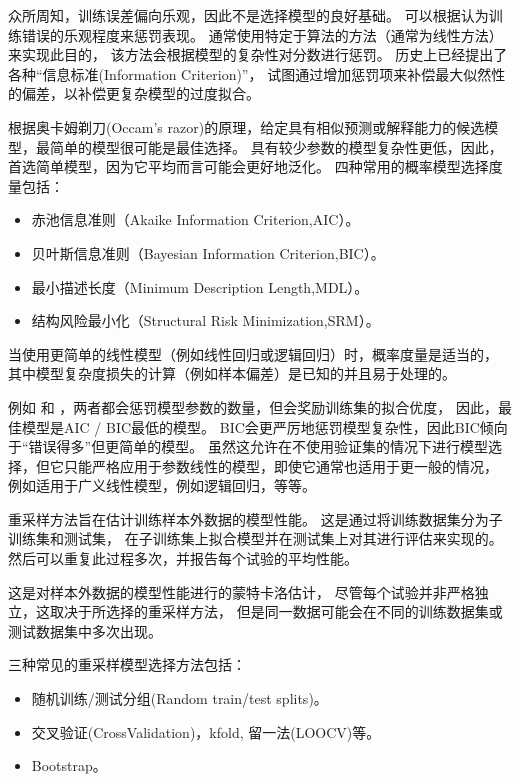 \documentclass[letterpaper,10pt,english]{sphinxmanual}
\begin{document}
众所周知，训练误差偏向乐观，因此不是选择模型的良好基础。
可以根据认为训练错误的乐观程度来惩罚表现。
通常使用特定于算法的方法（通常为线性方法）来实现此目的，
该方法会根据模型的复杂性对分数进行惩罚。
历史上已经提出了各种“信息标准(Information Criterion)”，
试图通过增加惩罚项来补偿最大似然性的偏差，以补偿更复杂模型的过度拟合。

根据奥卡姆剃刀(Occam’s razor)的原理，给定具有相似预测或解释能力的候选模型，最简单的模型很可能是最佳选择。
具有较少参数的模型复杂性更低，因此，首选简单模型，因为它平均而言可能会更好地泛化。
四种常用的概率模型选择度量包括：
\begin{itemize}
\item {} 
赤池信息准则（Akaike Information Criterion,AIC）。

\item {} 
贝叶斯信息准则（Bayesian Information Criterion,BIC）。

\item {} 
最小描述长度（Minimum Description Length,MDL）。

\item {} 
结构风险最小化（Structural Risk Minimization,SRM）。

\end{itemize}

当使用更简单的线性模型（例如线性回归或逻辑回归）时，概率度量是适当的，
其中模型复杂度损失的计算（例如样本偏差）是已知的并且易于处理的。

例如  和
，两者都会惩罚模型参数的数量，但会奖励训练集的拟合优度，
因此，最佳模型是AIC / BIC最低的模型。
BIC会更严厉地惩罚模型复杂性，因此BIC倾向于“错误得多”但更简单的模型。
虽然这允许在不使用验证集的情况下进行模型选择，但它只能严格应用于参数线性的模型，即使它通常也适用于更一般的情况，
例如适用于广义线性模型，例如逻辑回归，等等。


重采样方法旨在估计训练样本外数据的模型性能。
这是通过将训练数据集分为子训练集和测试集，
在子训练集上拟合模型并在测试集上对其进行评估来实现的。
然后可以重复此过程多次，并报告每个试验的平均性能。

这是对样本外数据的模型性能进行的蒙特卡洛估计，
尽管每个试验并非严格独立，这取决于所选择的重采样方法，
但是同一数据可能会在不同的训练数据集或测试数据集中多次出现。

三种常见的重采样模型选择方法包括：
\begin{itemize}
\item {} 
随机训练/测试分组(Random train/test splits)。

\item {} 
交叉验证(Cross\sphinxhyphen{}Validation)，k\sphinxhyphen{}fold, 留一法(LOOCV)等。

\item {} 
Bootstrap。

\end{itemize}
\end{document}
